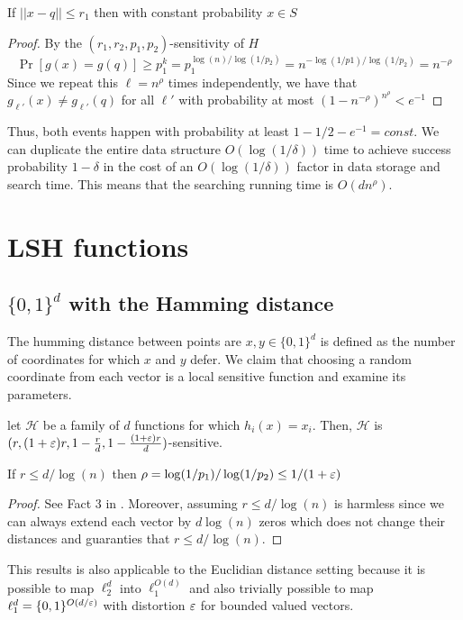 \documentclass{article}
\begin{document}
\begin{fact}
If $||x-q|| \le r_1$ then with constant probability $x \in S$
\end{fact}
\begin{proof}
By the $(r_1,r_2,p_1,p_2)$-sensitivity of $H$
\[
\Pr[g(x) = g(q)] \ge p_{1}^{k} = p_{1}^{\log(n)/\log(1/p_2)} = n^{-\log(1/p1)/\log(1/p_2)} = n^{-\rho}
\]
Since we repeat this $\ell = n^{\rho}$ times independently, we have that  $g_{\ell'}(x) \not = g_{\ell'}(q)$ for all 
$\ell'$ with probability at most $(1-n^{-\rho})^{n^{\rho}} < e^{-1}$ 
\end{proof}

Thus, both events happen with probability at least $1 - 1/2 - e^{-1} = const$.
We can duplicate the entire data structure $O(\log(1/\delta))$ time to achieve success probability $1-\delta$
in the cost of an $O(\log(1/\delta))$ factor in data storage and search time.
This means that the searching running time is $O(dn^{\rho})$.

\section{LSH functions}
\subsection{$\{0,1\}^d$  with the Hamming distance}
The humming distance between points are $x,y\in \{0,1\}^d$ is defined as 
the number of coordinates for which $x$ and $y$ defer. We claim that choosing a random 
coordinate from each vector is a local sensitive function and examine its parameters.   
\begin{fact}
let $\mathcal{H}$ be a family of $d$ functions for which $h_i(x) = x_i$.
Then, $\mathcal{H}$ is $(r,(1+\varepsilon)r,1-\frac{r}{d},1-\frac{(1+\varepsilon)r}{d})$-sensitive.
\end{fact}
\begin{fact}
If $r \le d/\log(n)$ then $\rho = \log(1/p_1)/\log(1/p_2) \le 1/(1+\varepsilon)$
\end{fact}
\begin{proof}
See Fact 3 in \cite{GionisIM99}. Moreover, assuming $r \le d/\log(n)$ is harmless since we can always 
extend each vector by $d\log(n)$ zeros which does not change their distances and guaranties that  $r \le d/\log(n)$.
 \end{proof}


\begin{remark}
This results is also applicable to the Euclidian distance setting because it is possible
to map $\ell_{2}^{d}$ into $\ell_{1}^{O(d)}$ and also trivially possible to map $\ell_{1}^{d} = \{0,1\}^{O(d/\varepsilon)}$ with distortion 
$\varepsilon$ for bounded valued vectors. 
\end{remark}
\end{document}
